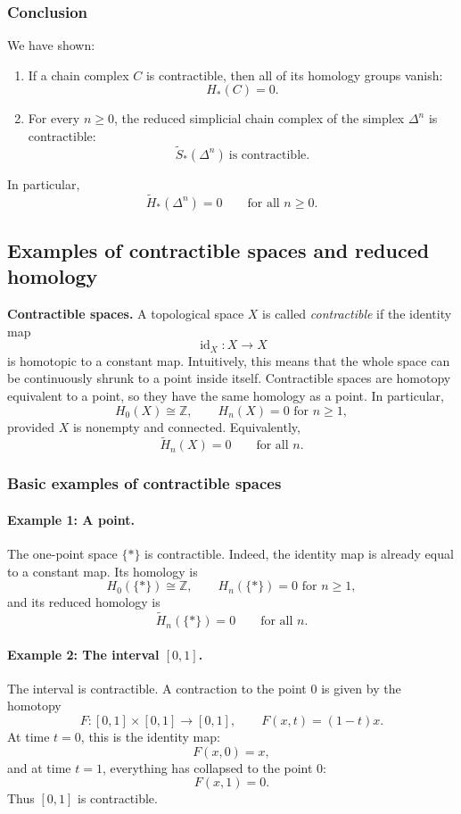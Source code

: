 \documentclass[12pt,a4paper]{article}
\theoremstyle{notespace}
\begin{document}
\subsubsection{Conclusion}

We have shown:

\begin{enumerate}
	\item If a chain complex \(C\) is contractible, then all of its homology groups vanish:
	\[
	H_*(C)=0.
	\]
	\item For every \(n\ge 0\), the reduced simplicial chain complex of the simplex \(\Delta^n\) is contractible:
	\[
	\widetilde{S}_*(\Delta^n)\ \text{is contractible}.
	\]
\end{enumerate}

In particular,
\[
\widetilde{H}_*(\Delta^n)=0
\qquad \text{for all } n\ge 0.
\]

\subsection{Examples of contractible spaces and reduced homology}

\textbf{Contractible spaces.}
A topological space \(X\) is called \emph{contractible} if the identity map
\[
\operatorname{id}_X : X \to X
\]
is homotopic to a constant map. Intuitively, this means that the whole space can be continuously shrunk to a point inside itself. Contractible spaces are homotopy equivalent to a point, so they have the same homology as a point. In particular,
\[
H_0(X)\cong \mathbb{Z}, \qquad H_n(X)=0 \text{ for } n\ge 1,
\]
provided \(X\) is nonempty and connected. Equivalently,
\[
\widetilde{H}_n(X)=0 \qquad \text{for all } n.
\]

\subsubsection{Basic examples of contractible spaces}

\paragraph{Example 1: A point.}
The one-point space \(\{*\}\) is contractible. Indeed, the identity map is already equal to a constant map. Its homology is
\[
H_0(\{*\})\cong \mathbb{Z}, \qquad H_n(\{*\})=0 \text{ for } n\ge 1,
\]
and its reduced homology is
\[
\widetilde{H}_n(\{*\})=0 \qquad \text{for all } n.
\]

\paragraph{Example 2: The interval \([0,1]\).}
The interval is contractible. A contraction to the point \(0\) is given by the homotopy
\[
F:[0,1]\times [0,1]\to [0,1], \qquad F(x,t)=(1-t)x.
\]
At time \(t=0\), this is the identity map:
\[
F(x,0)=x,
\]
and at time \(t=1\), everything has collapsed to the point \(0\):
\[
F(x,1)=0.
\]
Thus \([0,1]\) is contractible.
\end{document}
